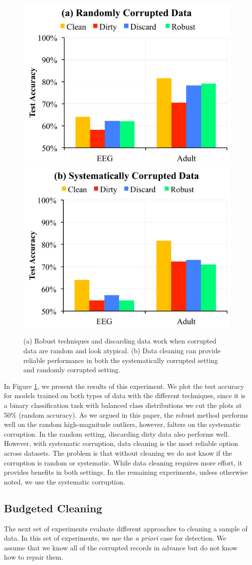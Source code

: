 \begin{figure}[ht!]
\centering
 \includegraphics[width=0.49\columnwidth]{exp/exp2.pdf}
 \includegraphics[width=0.49\columnwidth]{exp/exp1.pdf}
 \caption{(a) Robust techniques and discarding data work when corrupted data are random and look atypical. (b) Data cleaning can provide reliable performance in both the systematically corrupted setting and randomly corrupted setting.\label{sys-rand}}
\end{figure}

In Figure \ref{sys-rand}, we present the results of this experiment.
We plot the test accuracy for models trained on both types of data with the different techniques, since it is a binary classification task with balanced class distributions we cut the plots at 50\% (random accuracy).
As we argued in this paper, the robust method performs well on the random high-magnitude outliers, however, falters on the systematic corruption.
In the random setting, discarding dirty data also performs well.
However, with systematic corruption, data cleaning is the most reliable option across datasets.
The problem is that without cleaning we do not know if the corruption is random or systematic.
While data cleaning requires more effort, it provides benefits in both settings.
In the remaining experiments, unless otherwise noted, we use the systematic corruption.

\subsection{Budgeted Cleaning}
The next set of experiments evaluate different approaches to cleaning a sample of data.
In this set of experiments, we use the \emph{a priori} case for detection.
We assume that we know all of the corrupted records in advance but do not know how to repair them. 

